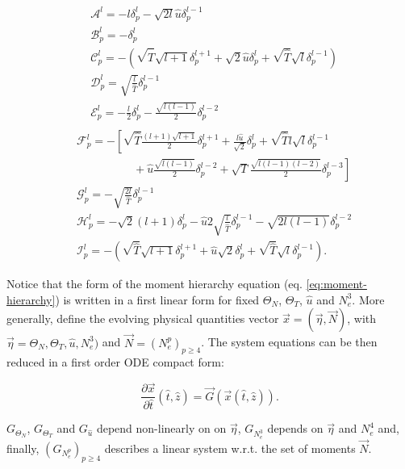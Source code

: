 \documentclass[final]{jpp}
\begin{document}
\begin{align}
&\mathcal{A}^l = - l \delta_p^l - \sqrt{2l} \hat{u} \delta_p^{l-1} \\
&\mathcal{B}_p^l= -\delta_p^l\\
&\mathcal{C}_p^l=-\left(\sqrt{\hat{T}} \sqrt{l+1}\delta_p^{l+1}+ \sqrt{2}\hat{u} \delta_{p}^{l} +\sqrt{\hat{T}} \sqrt{l}\delta_p^{l-1} \right)\\
&\mathcal{D}_p^l=\sqrt{\frac{l}{\hat{T}}} \delta_p^{l-1} \\
&\mathcal{E}_p^l=- \frac{l}{2}\delta_p^l -\frac{\sqrt{l(l-1)}}{2}\delta_p^{l-2} \\
\end{align}
\begin{align}
&\mathcal{F}_p^l=-\left[\sqrt{\hat{T}} \frac{(l+1)\sqrt{l+1}}{2} \delta_p^{l+1} + \frac{l\hat{u}}{\sqrt{2}} \delta_p^l  +\sqrt{\hat{T}}  l \sqrt{l}\delta_p^{l-1}\right. \nonumber\\
& \left.  \;\;\;\;\;\;\;\;\;\;\;\;\;\;\;\;\;\;+  \hat{u} \frac{\sqrt{l(l-1)}}{2}   \delta_p^{l-2}  + \sqrt{T} \frac{\sqrt{l(l-1)(l-2)}}{2} \delta_p^{l-3} \right] \\
&\mathcal{G}_p^l=- \sqrt{\frac{2l}{\hat{T}}}\delta_p^{l-1} \nonumber\\
&\mathcal{H}_p^l=  - \sqrt{2}(l+1) \delta_p^l - \hat{u}2\sqrt{\frac{l}{\hat{T}}}  \delta_p^{l-1} - \sqrt{2l(l-1)} \delta_p^{l-2} \\
&\mathcal{I}_p^l=-\left(\sqrt{\hat{T}} \sqrt{l+1}\delta_p^{l+1}+\hat{u}\sqrt{2}\delta_p^l + \sqrt{\hat{T}} \sqrt{l}\delta_p^{l-1} \right).
\end{align}

Notice that the form of the moment hierarchy equation (eq. \ref{eq:moment-hierarchy}) is written in a first linear form for fixed $\Theta_N$, $\Theta_T$, $\hat{u}$ and $N_e^3$.
More generally, define the evolving physical quantities vector $\vec{x} = (\vec{\eta}, \vec{N})$, with $\vec{\eta} = \Theta_N, \Theta_T, \hat{u}, N_e^3)$ and $\vec{N} = (N_e^p)_{p \ge 4}$.
The system equations can be then reduced in a first order ODE compact form:

\begin{equation} \label{eq:system}
    \frac{\partial \vec{x}}{\partial \hat{t}}(\hat{t}, \hat{z}) = \vec{G}(\vec{x}(\hat{t}, \hat{z})).
\end{equation}

$G_{\Theta_N}$, $G_{\Theta_T}$ and $G_{\hat{u}}$ depend non-linearly on on $\vec{\eta}$, $G_{N_e^3}$ depends on $\vec{\eta}$ and $N_e^4$ and, finally, $(G_{N_e^p})_{p \ge 4}$ describes a linear system w.r.t. the set of moments $\vec{N}$.
\end{document}

